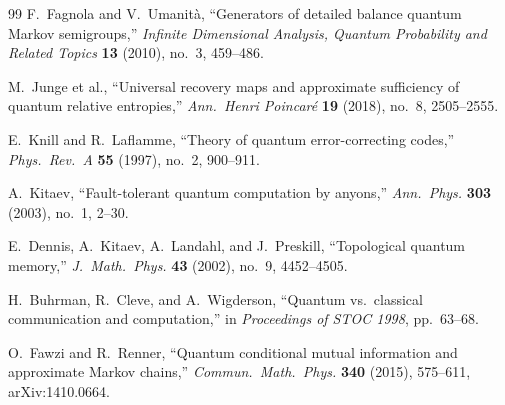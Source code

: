 \documentclass[11pt]{article}
\theoremstyle{remark}
\theoremstyle{plain}
\begin{document}
\begin{thebibliography}{99}
F.~Fagnola and V.~Umanit\`a,
``Generators of detailed balance quantum Markov semigroups,''
\emph{Infinite Dimensional Analysis, Quantum Probability and Related Topics}
\textbf{13} (2010), no.~3, 459--486.

M.~Junge et al.,
``Universal recovery maps and approximate sufficiency of quantum relative entropies,''
\emph{Ann.\ Henri Poincar\'e} \textbf{19} (2018), no.~8, 2505--2555.

E.~Knill and R.~Laflamme,
``Theory of quantum error-correcting codes,''
\emph{Phys.\ Rev.\ A} \textbf{55} (1997), no.~2, 900--911.

A.~Kitaev,
``Fault-tolerant quantum computation by anyons,''
\emph{Ann.\ Phys.} \textbf{303} (2003), no.~1, 2--30.

E.~Dennis, A.~Kitaev, A.~Landahl, and J.~Preskill,
``Topological quantum memory,''
\emph{J.\ Math.\ Phys.} \textbf{43} (2002), no.~9, 4452--4505.

H.~Buhrman, R.~Cleve, and A.~Wigderson,
``Quantum vs.\ classical communication and computation,''
in \emph{Proceedings of STOC 1998}, pp.~63--68.

O.~Fawzi and R.~Renner,
``Quantum conditional mutual information and approximate Markov chains,''
\emph{Commun.\ Math.\ Phys.} \textbf{340} (2015), 575--611,
arXiv:1410.0664.

\end{thebibliography}
\end{document}
